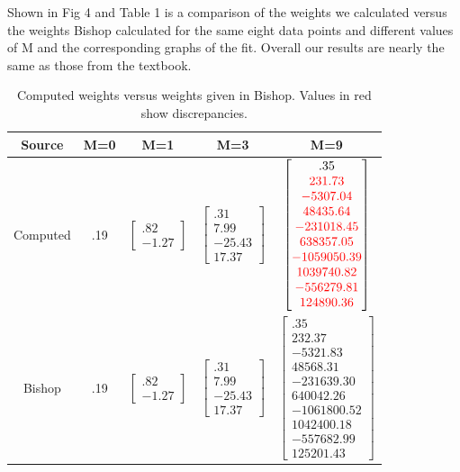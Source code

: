 \documentclass[10pt,twocolumn]{article}
\begin{document}
Shown in Fig 4 and Table 1 is a comparison of the weights we calculated versus the weights Bishop calculated for the same eight data points and different values of M and the corresponding graphs of the fit. Overall our results are nearly the same as those from the textbook.

\begin{table}
\scriptsize
\begin{center}
	\begin{tabular}{| c | c | c | c | c |}
	\hline
	Source & M=0 & M=1 & M=3 & M=9 \\ \hline
	Computed  &  .19 & $\begin{bmatrix} .82 \\ -1.27 \end{bmatrix}$ & $\begin{bmatrix} .31 \\ 7.99 \\ -25.43 \\ 17.37 \end{bmatrix}$ & $\begin{bmatrix} .35 \\ \textcolor{red}{231.73} \\ \textcolor{red}{-5307.04} \\ \textcolor{red}{48435.64} \\  \textcolor{red}{-231018.45} \\ \textcolor{red}{638357.05} \\ \textcolor{red}{-1059050.39} \\ \textcolor{red}{1039740.82} \\ \textcolor{red}{-556279.81} \\ \textcolor{red}{124890.36} \end{bmatrix}$  \\ \hline
	Bishop  &  .19 & $\begin{bmatrix} .82 \\ -1.27 \end{bmatrix}$ & $\begin{bmatrix} .31 \\ 7.99 \\ -25.43 \\ 17.37 \end{bmatrix}$ & $\begin{bmatrix} .35 \\ 232.37 \\ -5321.83 \\ 48568.31 \\  -231639.30 \\ 640042.26 \\ -1061800.52 \\ 1042400.18 \\ -557682.99 \\ 125201.43 \end{bmatrix}$  \\ \hline
	\end{tabular}
\caption{Computed weights versus weights given in Bishop. Values in red show discrepancies.}
\end{center}
\end{table}
\end{document}
